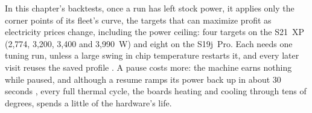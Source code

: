 In this chapter's backtests, once a run has left stock power, it applies only the corner points of its fleet's curve, the targets that can maximize profit as electricity prices change, including the power ceiling: four targets on the S21~XP (2,774, 3,200, 3,400 and 3,990~W) and eight on the S19j~Pro. %
Each needs one tuning run, unless a large swing in chip temperature restarts it, and every later visit reuses the saved profile \autocite{braiinsacademyautotuning}.
A pause costs more: the machine earns nothing while paused, and although a resume ramps its power back up in about 30 seconds \autocite{braiinsacademyramping}, every full thermal cycle, the boards heating and cooling through tens of degrees, spends a little of the hardware's life. %
